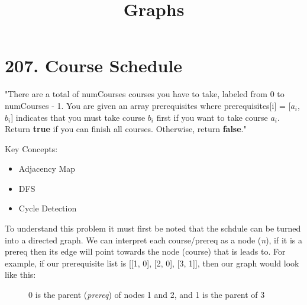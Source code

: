 \documentclass{article}
\begin{document}
\date{}
\title{Graphs}
\author{}
\maketitle
\section*{207. Course Schedule}
\begin{flushleft}
    "There are a total of numCourses courses you have to take, labeled from 0 to numCourses - 1. You are given an array prerequisites where prerequisites[i] = [$a_i$, $b_i$] indicates that you must take course $b_i$ first if you want to take course $a_i$.
    Return \textbf{true} if you can finish all courses. Otherwise, return \textbf{false}."
\end{flushleft}
Key Concepts:
\begin{itemize}
    \item Adjacency Map
    \item DFS
    \item Cycle Detection
\end{itemize}

\begin{flushleft}
    To understand this problem it must first be noted that the schdule can be turned into a directed graph.
    We can interpret each course/prereq as a node (\textit{n}), if it is a prereq then its edge will point towards the node (course) that is leads to.
    For example, if our prerequisite list is [[1, 0], [2, 0], [3, 1]], then our graph would look like this:
\end{flushleft}
\begin{figure}[H]
    \centering
    \caption{0 is the parent (\textit{prereq}) of nodes 1 and 2, and 1 is the parent of 3}
\end{figure}
\end{document}

